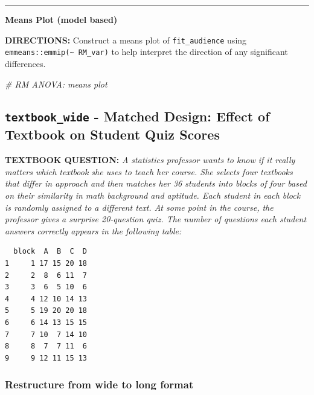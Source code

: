 \documentclass[
]{article}
\newenvironment{Shaded}{\begin{snugshade}}{\end{snugshade}}
\newcommand{\CommentTok}[1]{\textcolor[rgb]{0.56,0.35,0.01}{\textit{#1}}}
\begin{document}
\begin{center}\rule{0.5\linewidth}{\linethickness}\end{center}

\textbf{Means Plot (model based)}

\textbf{DIRECTIONS:} Construct a means plot of \texttt{fit\_audience}
using \texttt{emmeans::emmip(\textasciitilde{}\ RM\_var)} to help
interpret the direction of any significant differences.

\begin{Shaded}
\begin{Highlighting}[]
\CommentTok{# RM ANOVA: means plot}
\end{Highlighting}
\end{Shaded}

\clearpage

\hypertarget{textbook_wide---matched-design-effect-of-textbook-on-student-quiz-scores}{%
\subsection{\texorpdfstring{\texttt{textbook\_wide} - Matched Design:
Effect of Textbook on Student Quiz
Scores}{textbook\_wide - Matched Design: Effect of Textbook on Student Quiz Scores}}\label{textbook_wide---matched-design-effect-of-textbook-on-student-quiz-scores}}

\textbf{TEXTBOOK QUESTION:} \emph{A statistics professor wants to know
if it really matters which textbook she uses to teach her course. She
selects four textbooks that differ in approach and then matches her 36
students into blocks of four based on their similarity in math
background and aptitude. Each student in each block is randomly assigned
to a different text. At some point in the course, the professor gives a
surprise 20-question quiz. The number of questions each student answers
correctly appears in the following table:}

\begin{verbatim}
  block  A  B  C  D
1     1 17 15 20 18
2     2  8  6 11  7
3     3  6  5 10  6
4     4 12 10 14 13
5     5 19 20 20 18
6     6 14 13 15 15
7     7 10  7 14 10
8     8  7  7 11  6
9     9 12 11 15 13
\end{verbatim}

\hypertarget{restructure-from-wide-to-long-format-3}{%
\subsubsection{Restructure from wide to long
format}\label{restructure-from-wide-to-long-format-3}}
\end{document}

